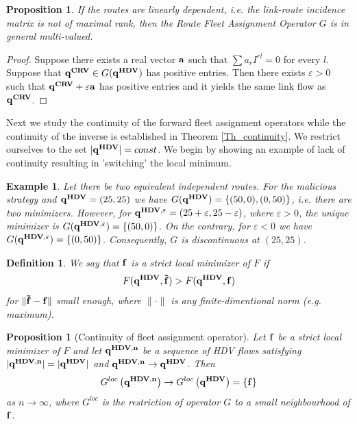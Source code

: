 \documentclass[a4paper,11pt]{article}
\newtheorem{proposition}[theorem]{Proposition}
\newtheorem{definition}[theorem]{Definition}
\newtheorem{example}[theorem]{Example}
\begin{document}
\begin{proposition}
If the routes are linearly dependent, i.e. the link-route incidence matrix is not of maximal rank, then the Route Fleet Assignment Operator $G$ is in general multi-valued. 
\end{proposition}
\begin{proof}
Suppose there exists a real vector $\bold{a}$ such that $\sum a_r I^{rl} = 0$ for every $l$. Suppose that $\bold{q^{CRV}} \in G(\bold{q^{HDV}})$ has positive entries. Then there exists $\varepsilon > 0$ such that $\bold{q^{CRV}} + \varepsilon \bold{a}$ has positive entries and it yields the same link flow as $\bold{q^{CRV}}$.  
\end{proof}


Next we study the continuity of the forward fleet assignment operators while the continuity of the inverse is established in Theorem \ref{Th_continuity}. We restrict ourselves to the set $|\bold{q^{HDV}}| = const$. We begin by showing an example of lack of continuity resulting in 'switching' the local minimum. 


\begin{example}
\label{Ex_switching}
Let there be two equivalent independent routes. For the malicious strategy and $\bold{q^{HDV}} = (25,25)$ we have $G(\bold{q^{HDV}}) = \{(50,0), (0,50)\}$, i.e. there are two minimizers. However, for $\bold{q^{HDV, \varepsilon}} = (25+\varepsilon,25-\varepsilon)$, where $\varepsilon > 0$, the unique minimizer is  $G(\bold{q^{HDV, \varepsilon}}) = \{(50,0)\}$. On the contrary, for $\varepsilon < 0$ we have $G(\bold{q^{HDV, \varepsilon}}) = \{(0,50)\}$. Consequently, $G$ is discontinuous at $(25,25)$. 
\end{example}

\begin{definition}
We say that $\bold{f}$ is a strict local minimizer of $F$ if $$F(\bold{q^{HDV}}, \bold{\tilde{f}}) > F(\bold{q^{HDV}},\bold{f})$$ for $\|\bold{\tilde{f}} - \bold{f}\|$ small enough, where $\|\cdot\|$ is any  finite-dimentional norm (e.g. maximum).
\end{definition}

\begin{proposition}[Continuity of fleet assignment operator]
\label{Prop_continuityFA}
Let $\bold{f}$ be a strict local minimizer of $F$ and let $\bold{q^{HDV,n}}$ be a sequence of HDV flows satisfying $|\bold{q^{HDV,n}}| = |\bold{q^{HDV}}|$ and $\bold{q^{HDV,n}} \to \bold{q^{HDV}}$. Then 
$$G^{loc}\left(\bold{q^{HDV,n}}\right) \to G^{loc}\left(\bold{q^{HDV}}\right) = \{\bold{f}\}$$
as $n \to \infty$, where $G^{loc}$ is the restriction of operator $G$ to a small neighbourhood of $\bold{f}$.  

\end{proposition}
\end{document}
